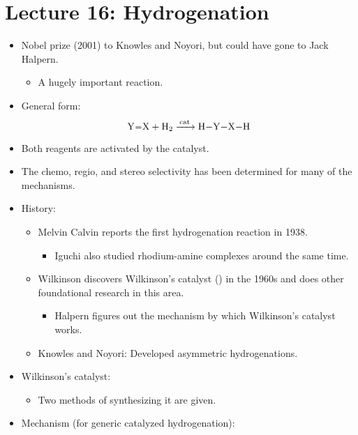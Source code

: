 \documentclass[../notes.tex]{subfiles}
\begin{document}
\section{Lecture 16: Hydrogenation}
\begin{itemize}
    \item {}Nobel prize (2001) to Knowles and Noyori, but could have gone to Jack Halpern.
    \begin{itemize}
        \item A hugely important reaction.
    \end{itemize}
    \item General form:
    \begin{equation*}
        \ce{Y=X + H2 ->[{cat}] H-Y-X-H}
    \end{equation*}
    \item Both reagents are activated by the catalyst.
    \item The chemo, regio, and stereo selectivity has been determined for many of the mechanisms.
    \item History:
    \begin{itemize}
        \item Melvin Calvin reports the first hydrogenation reaction in 1938.
        \begin{itemize}
            \item Iguchi also studied rhodium-amine complexes around the same time.
        \end{itemize}
        \item Wilkinson discovers Wilkinson's catalyst () in the 1960s and does other foundational research in this area.
        \begin{itemize}
            \item Halpern figures out the mechanism by which Wilkinson's catalyst works.
        \end{itemize}
        \item Knowles and Noyori: Developed asymmetric hydrogenations.
    \end{itemize}
    \item Wilkinson's catalyst:
    \begin{itemize}
        \item Two methods of synthesizing it are given.
    \end{itemize}
    \item Mechanism (for generic catalyzed hydrogenation):
    \begin{figure}[h!]
        \centering

\end{figure}
\end{itemize}
\end{document}
